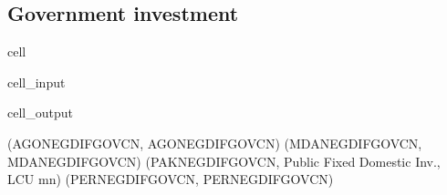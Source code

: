 \documentclass[letterpaper,10pt,english]{jupyterBook}
\begin{document}
\subsection{Government investment}
\label{\detokenize{content/howto/onboard/eviews/onboard many models from wf1:government-investment}}
\begin{sphinxuseclass}{cell}\begin{sphinxVerbatimInput}

\begin{sphinxuseclass}{cell_input}
\begin{sphinxVerbatim}[commandchars=\\\{\}]
\end{sphinxVerbatim}

\end{sphinxuseclass}\end{sphinxVerbatimInput}
\begin{sphinxVerbatimOutput}

\begin{sphinxuseclass}{cell_output}
\begin{sphinxVerbatim}[commandchars=\\\{\}]
(\PYGZsq{}AGONEGDIFGOVCN\PYGZsq{}, \PYGZsq{}AGONEGDIFGOVCN\PYGZsq{})
(\PYGZsq{}MDANEGDIFGOVCN\PYGZsq{}, \PYGZsq{}MDANEGDIFGOVCN\PYGZsq{})
(\PYGZsq{}PAKNEGDIFGOVCN\PYGZsq{}, \PYGZsq{}Public Fixed Domestic Inv., LCU mn\PYGZsq{})
(\PYGZsq{}PERNEGDIFGOVCN\PYGZsq{}, \PYGZsq{}PERNEGDIFGOVCN\PYGZsq{})
\end{sphinxVerbatim}

\end{sphinxuseclass}\end{sphinxVerbatimOutput}

\end{sphinxuseclass}
\end{document}
